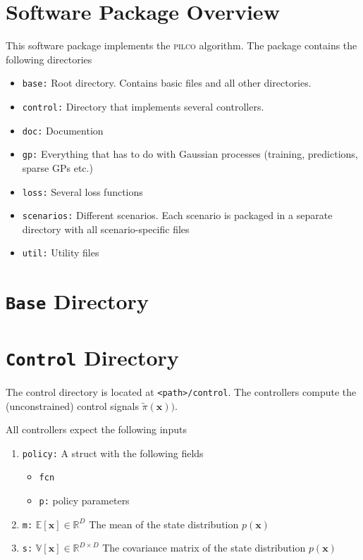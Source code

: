 \documentclass{article}
\renewcommand{\vec}[1]{\boldsymbol{#1}}  %
\newcommand{\E}{\mathds{E}}
\newcommand{\var}{\mathds{V}}
\newcommand{\R}{\mathds{R}}
\newcommand{\path}{\texttt{<path>/}}
\begin{document}
\section{Software Package Overview}

This software package implements the \textsc{pilco} algorithm. The
package contains the following directories

\begin{itemize}
\item \texttt{base:} Root directory. Contains basic files and all
  other directories.
\item \texttt{control:} Directory that implements several controllers.
\item \texttt{doc:} Documention
\item \texttt{gp:} Everything that has to do with Gaussian processes
  (training, predictions, sparse GPs etc.)
\item \texttt{loss:} Several loss functions
\item \texttt{scenarios:} Different scenarios. Each scenario is
  packaged in a separate directory with all scenario-specific files
\item \texttt{util:} Utility files
\end{itemize}

\section{\texttt{Base} Directory}


\section{\texttt{Control} Directory}
The control directory is located at \path\texttt{control}. The
controllers compute the (unconstrained) control signals
$\tilde\pi(\vec x))$.

All controllers expect the following inputs
\begin{enumerate}
\item \texttt{policy:} A struct with the following fields
\begin{itemize}
\item \texttt{fcn}
\item \texttt{p:} policy parameters
\end{itemize}
\item \texttt{m:} $\E[\vec x]\in\R^D$ The mean of the state
  distribution $p(\vec x)$
\item \texttt{s:} $\var[\vec x]\in\R^{D\times D}$ The covariance
  matrix of the state distribution $p(\vec x)$
\end{enumerate}
\end{document}
